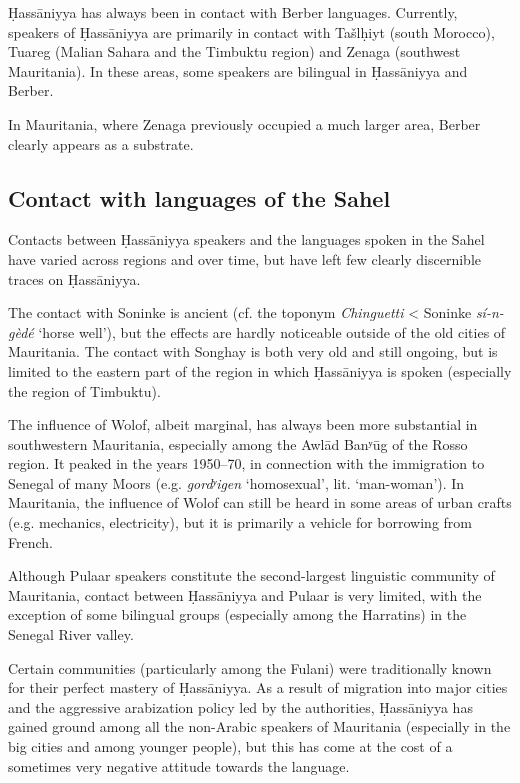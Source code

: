 \documentclass[output=paper]{langsci/langscibook}
\begin{document}
Ḥassāniyya has always been in contact with Berber languages. Currently, speakers of Ḥassāniyya are primarily in contact with Tašlḥiyt (south Morocco), Tuareg (Malian Sahara and the Timbuktu region) and Zenaga (southwest Mauritania). In these areas, some speakers are bilingual in Ḥassāniyya and Berber. 

In Mauritania, where Zenaga previously occupied a much larger area, Berber clearly appears as a substrate.

\subsection{Contact with languages of the Sahel} %

Contacts between Ḥassāniyya speakers and the languages spoken in the Sahel have varied across regions and over time, but have left few clearly discernible traces on Ḥassāniyya.

The contact with Soninke is ancient (cf. the toponym \textit{Chinguetti} < Soninke \textit{sí-n-gèdé} ‘horse well’), but the effects are hardly noticeable outside of the old cities of Mauritania. The contact with Songhay is both very old and still ongoing, but is limited to the eastern part of the region in which Ḥassāniyya is spoken (especially the region of Timbuktu).

The influence of Wolof, albeit marginal, has always been more substantial in southwestern Mauritania, especially among the Awlād Banʸūg of the Rosso region. It peaked in the years 1950–70, in connection with the immigration to Senegal of many Moors (e.g. \textit{gordʸigen} ‘homosexual’, lit. ‘man-woman’). In Mauritania, the influence of Wolof can still be heard in some areas of urban crafts (e.g. mechanics, electricity), but it is primarily a vehicle for borrowing from French.

Although Pulaar speakers constitute the second-largest linguistic community of Mauritania, contact between Ḥassāniyya and Pulaar is very limited, with the exception of some bilingual groups (especially among the Harratins) in the Senegal River valley.

Certain communities (particularly among the Fulani) were traditionally known for their perfect mastery of Ḥassāniyya. As a result of migration into major cities and the aggressive arabization policy led by the authorities, Ḥassāniyya has gained ground among all the non-Arabic speakers of Mauritania (especially in the big cities and among younger people), but this has come at the cost of a sometimes very negative attitude towards the language. 
\end{document}
